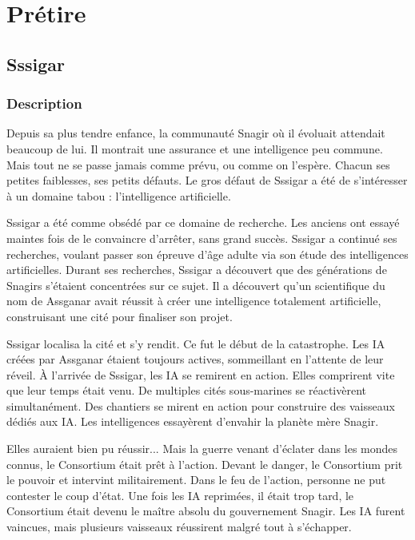 \part{Prétire}

\chapter*{Sssigar}

\section*{Description}

Depuis sa plus tendre enfance, la communauté Snagir où il évoluait attendait beaucoup de lui. Il montrait une assurance et une intelligence peu commune. Mais tout ne se passe jamais comme prévu, ou comme on l'espère. Chacun ses petites faiblesses, ses petits défauts. Le gros défaut de Sssigar a été de s'intéresser à un domaine tabou : l'intelligence artificielle.

Sssigar a été comme obsédé par ce domaine de recherche. Les anciens ont essayé maintes fois de le convaincre d'arrêter, sans grand succès. Sssigar a continué ses recherches, voulant passer son épreuve d'âge adulte via son étude des intelligences artificielles. Durant ses recherches, Sssigar a découvert que des générations de Snagirs s'étaient concentrées sur ce sujet. Il a découvert qu'un scientifique du nom de Assganar avait réussit à créer une intelligence totalement artificielle, construisant une cité pour finaliser son projet.

Sssigar localisa la cité et s'y rendit. Ce fut le début de la catastrophe. Les IA créées par Assganar étaient toujours actives, sommeillant en l'attente de leur réveil. À l'arrivée de Sssigar, les IA se remirent en action. Elles comprirent vite que leur temps était venu. De multiples cités sous-marines se réactivèrent simultanément. Des chantiers se mirent en action pour construire des vaisseaux dédiés aux IA. Les intelligences essayèrent d'envahir la planète mère Snagir. 

Elles auraient bien pu réussir... Mais la guerre venant d'éclater dans les mondes connus, le Consortium était prêt à l'action. Devant le danger, le Consortium prit le pouvoir et intervint militairement. Dans le feu de l'action, personne ne put contester le coup d'état. Une fois les IA reprimées, il était trop tard, le Consortium était devenu le maître absolu du gouvernement Snagir. Les IA furent vaincues, mais plusieurs vaisseaux réussirent malgré tout à s'échapper. 


